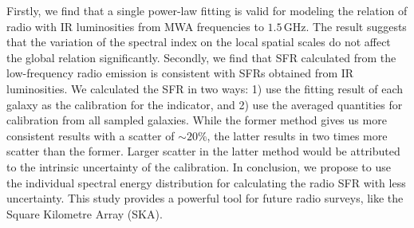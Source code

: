 \documentclass[12pt,a4paper,twoside,openright,titlepage,draft]{report}
\begin{document}
Firstly, we find that a single power-law fitting is valid for modeling the relation of radio with IR luminosities from MWA frequencies to $1.5\,\mathrm{GHz}$.
The result suggests that the variation of the spectral index on the local spatial scales do not affect the global relation significantly.
Secondly, we find that SFR calculated from the low-frequency radio emission is consistent with SFRs obtained from IR luminosities.
We calculated the SFR in two ways: 1) use the fitting result of each galaxy as the calibration for the indicator, and 2) use the averaged quantities for calibration from all sampled galaxies.
While the former method gives us more consistent results with a scatter of $\sim20\%$, the latter results in two times more scatter than the former.
Larger scatter in the latter method would be attributed to the intrinsic uncertainty of the calibration.
In conclusion, we propose to use the individual spectral energy distribution for calculating the radio SFR with less uncertainty.
This study provides a powerful tool for future radio surveys, like the Square Kilometre Array (SKA).
\end{document}
